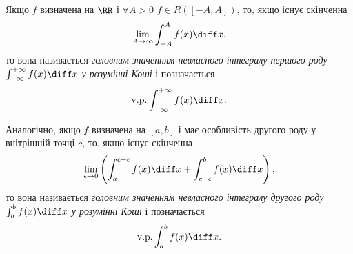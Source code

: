 \begin{definition}
    Якщо $f$ визначена на $\RR$ і $\forall A > 0$ $f \in R([-A, A])$, то, якщо існує скінченна
    \begin{equation}
        \lim_{A \to \infty} \int_{-A}^A f(x) \diff x,
    \end{equation}
    то вона називається \textit{головним значенням невласного інтегралу першого роду $\int_{-\infty}^{+\infty} f(x) \diff x$ у розумінні Коші} і позначається
    \begin{equation}
        \text{v.p.} \int_{-\infty}^{+\infty} f(x) \diff x.
    \end{equation}
\end{definition}

\begin{definition}
    Аналогічно, якщо $f$ визначена на $[a, b]$ і має особливість другого роду у внітрішній точці $c$, то, якщо існує скінченна
    \begin{equation}
        \lim_{\epsilon \to 0} \left( \int_a^{c - \epsilon} f(x) \diff x + \int_{c + \epsilon}^b f(x) \diff x \right),
    \end{equation}
    то вона називається \textit{головним значенням невласного інтегралу другого роду $\int_a^b f(x) \diff x$ у розумінні Коші} і позначається
    \begin{equation}
        \text{v.p.} \int_a^b f(x) \diff x.
    \end{equation}
\end{definition}

